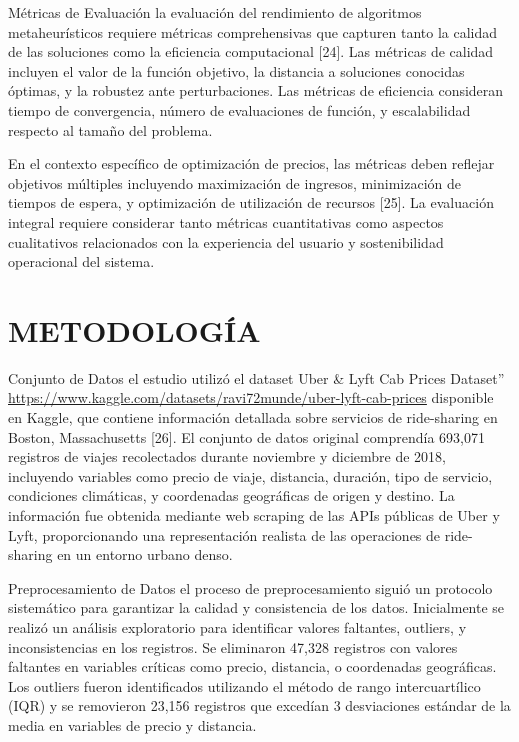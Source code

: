 \documentclass[12pt,a4paper,twocolumn]{article}
\begin{document}
Métricas de Evaluación la evaluación del rendimiento de algoritmos metaheurísticos requiere métricas comprehensivas que capturen tanto la calidad de las soluciones como la eficiencia computacional [24]. Las métricas de calidad incluyen el valor de la función objetivo, la distancia a soluciones conocidas óptimas, y la robustez ante perturbaciones. Las métricas de eficiencia consideran tiempo de convergencia, número de evaluaciones de función, y escalabilidad respecto al tamaño del problema.

En el contexto específico de optimización de precios, las métricas deben reflejar objetivos múltiples incluyendo maximización de ingresos, minimización de tiempos de espera, y optimización de utilización de recursos [25]. La evaluación integral requiere considerar tanto métricas cuantitativas como aspectos cualitativos relacionados con la experiencia del usuario y sostenibilidad operacional del sistema.

\section{METODOLOGÍA}

Conjunto de Datos el estudio utilizó el dataset Uber \& Lyft Cab Prices Dataset'' \url{https://www.kaggle.com/datasets/ravi72munde/uber-lyft-cab-prices} disponible en Kaggle, que contiene información detallada sobre servicios de ride-sharing en Boston, Massachusetts [26]. El conjunto de datos original comprendía 693,071 registros de viajes recolectados durante noviembre y diciembre de 2018, incluyendo variables como precio de viaje, distancia, duración, tipo de servicio, condiciones climáticas, y coordenadas geográficas de origen y destino. La información fue obtenida mediante web scraping de las APIs públicas de Uber y Lyft, proporcionando una representación realista de las operaciones de ride-sharing en un entorno urbano denso.

Preprocesamiento de Datos el proceso de preprocesamiento siguió un protocolo sistemático para garantizar la calidad y consistencia de los datos. Inicialmente se realizó un análisis exploratorio para identificar valores faltantes, outliers, y inconsistencias en los registros. Se eliminaron 47,328 registros con valores faltantes en variables críticas como precio, distancia, o coordenadas geográficas. Los outliers fueron identificados utilizando el método de rango intercuartílico (IQR) y se removieron 23,156 registros que excedían 3 desviaciones estándar de la media en variables de precio y distancia.
\end{document}
